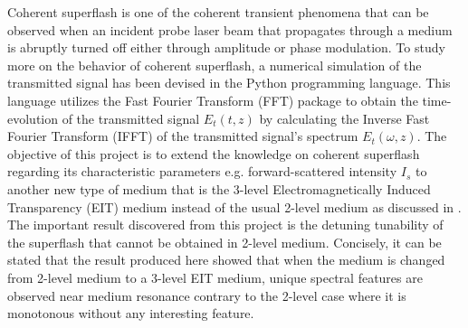 
Coherent superflash is one of the coherent transient phenomena that can be observed when an incident probe laser beam that propagates through a medium is abruptly turned off either through amplitude or phase modulation. To study more on the behavior of coherent superflash, a numerical simulation of the transmitted signal has been devised in the Python programming language. This language utilizes the Fast Fourier Transform (FFT) package to obtain the time-evolution of the transmitted signal $E_{t}(t, z)$ by calculating the Inverse Fast Fourier Transform (IFFT) of the transmitted signal's spectrum $E_{t}(\omega, z)$. The objective of this project is to extend the knowledge on coherent superflash regarding its characteristic parameters e.g. forward-scattered intensity $I_{s}$ to another new type of medium that is the 3-level Electromagnetically Induced Transparency (EIT) medium instead of the usual 2-level medium as discussed in \cite{Kwong2014}. The important result discovered from this project is the detuning tunability of the superflash that cannot be obtained in 2-level medium. Concisely, it can be stated that the result produced here showed that when the medium is changed from 2-level medium to a 3-level EIT medium, unique spectral features are observed near medium resonance contrary to the 2-level case where it is monotonous without any interesting feature.


